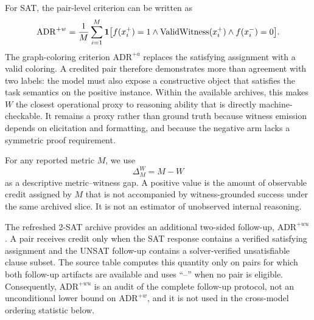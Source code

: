 \documentclass[acmsmall,screen,review,anonymous]{acmart}
\providecommand{\ADRw}{\mathrm{ADR}^{+w}}
\providecommand{\ADRa}{\mathrm{ADR}^{+a}}
\providecommand{\WitnessRate}{W}
\begin{document}
For SAT, the pair-level criterion can be written as
\[
\ADRw
=
\frac{1}{M}
\sum_{i=1}^{M}
\mathbf{1}
\bigl[
\model(x_i^{+})=1
\land
\mathrm{ValidWitness}(x_i^{+})
\land
\model(x_i^{-})=0
\bigr].
\]
The graph-coloring criterion \(\ADRa\) replaces the satisfying assignment with
a valid coloring. A credited pair therefore demonstrates more than agreement
with two labels: the model must also expose a constructive object that satisfies
the task semantics on the positive instance. Within the available archives,
this makes \(\WitnessRate\) the closest operational proxy to reasoning ability
that is directly machine-checkable. It remains a proxy rather than ground truth
because witness emission depends on elicitation and formatting, and because the
negative arm lacks a symmetric proof requirement.

For any reported metric \(M\), we use
\[
\Delta^{W}_{M}=M-\WitnessRate
\]
as a descriptive metric--witness gap. A positive value is the amount of
observable credit assigned by \(M\) that is not accompanied by witness-grounded
success under the same archived slice. It is not an estimator of unobserved
internal reasoning.

The refreshed 2-SAT archive provides an additional two-sided follow-up,
\(\mathrm{ADR}^{+wu}\). A pair receives credit only when the SAT response
contains a verified satisfying assignment and the UNSAT follow-up contains a
solver-verified unsatisfiable clause subset. The source table computes this
quantity only on pairs for which both follow-up artifacts are available and
uses ``--'' when no pair is eligible. Consequently,
\(\mathrm{ADR}^{+wu}\) is an audit of the complete follow-up protocol, not an
unconditional lower bound on \(\ADRw\), and it is not used in the cross-model
ordering statistic below.
\end{document}
